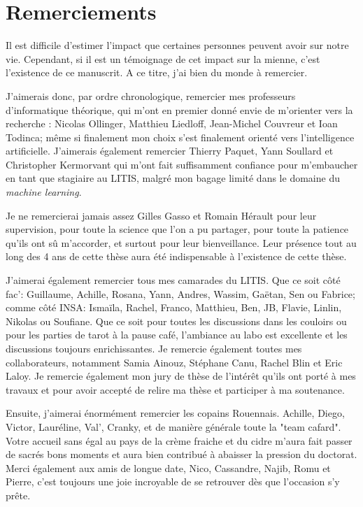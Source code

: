 \chapter*{Remerciements}
\label{chap:remerciements}

Il est difficile d'estimer l'impact que certaines personnes peuvent avoir sur notre vie. Cependant, si il est un témoignage de cet impact sur la mienne, c'est l'existence de ce manuscrit. A ce titre, j'ai bien du monde à remercier.

J'aimerais donc, par ordre chronologique, remercier mes professeurs d'informatique théorique, qui m'ont en premier donné envie de m'orienter vers la recherche : Nicolas Ollinger, Matthieu Liedloff, Jean-Michel Couvreur et Ioan Todinca; même si finalement mon choix s'est finalement orienté vers l'intelligence artificielle. J'aimerais également remercier Thierry Paquet, Yann Soullard et Christopher Kermorvant qui m'ont fait suffisamment confiance pour m'embaucher en tant que stagiaire au LITIS, malgré mon bagage limité dans le domaine du \textit{machine learning}.

Je ne remercierai jamais assez Gilles Gasso et Romain Hérault pour leur supervision, pour toute la science que l'on a pu partager, pour toute la patience qu'ils ont sû m'accorder, et surtout pour leur bienveillance. Leur présence tout au long des 4 ans de cette thèse aura été indispensable à l'existence de cette thèse.

J'aimerai également remercier tous mes camarades du LITIS. Que ce soit côté fac': Guillaume, Achille, Rosana, Yann, Andres, Wassim, Gaëtan, Sen ou Fabrice; comme côté INSA: Ismaïla, Rachel,  Franco, Matthieu, Ben, JB, Flavie, Linlin, Nikolas ou Soufiane. Que ce soit pour toutes les discussions dans les couloirs ou pour les parties de tarot à la pause café, l'ambiance au labo est excellente et les discussions toujours enrichissantes. Je remercie également toutes mes collaborateurs, notamment Samia Ainouz, Stéphane Canu, Rachel Blin et Eric Laloy. Je remercie également mon jury de thèse de l'intérêt qu'ils ont porté à mes travaux et pour avoir accepté de relire ma thèse et participer à ma soutenance.

Ensuite, j'aimerai énormément remercier les copains Rouennais. Achille, Diego, Victor, Lauréline, Val', Cranky, et de manière générale toute la "team cafard". Votre accueil sans égal au pays de la crème fraiche et du cidre m'aura fait passer de sacrés bons moments et aura bien contribué à abaisser la pression du doctorat.  Merci également aux amis de longue date, Nico, Cassandre, Najib, Romu et Pierre, c'est toujours une joie incroyable de se retrouver dès que l'occasion s'y prête.

